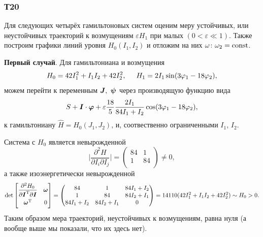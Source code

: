 \subsubsection*{Т20}


Для следующих четырёх гамильтоновых систем оценим меру устойчивых, или неустойчивых траекторий к возмущениям $\varepsilon H_1$ при малых $(0 < \varepsilon \ll 1)$. Также построим графики линий уровня $H_0 (I_1, I_2)$ и отложим на них $\omega \colon  \omega_2 = \text{const}$. 


\textbf{Первый случай}. Для гамильтониана и возмущения
\begin{equation*}
    H_0 = 42 I_1^2 + I_1 I_2 + 42 I_2^2, \hspace{5 mm} H_1 = 2 I_1 \sin(3 \varphi_1 - 18 \varphi_2),
\end{equation*}
можем перейти к переменным $\mbox{\boldmath $J$}, \ \mbox{\boldmath $\psi$}$ через производящую функцию вида
\begin{equation*}
    S + \mbox{\boldmath $I$} \cdot \mbox{\boldmath $\varphi$} + \varepsilon \frac{18}{5} \frac{2I_1}{84 I_1 + I_2} \cos(3 \varphi_1 - 18 \varphi_2),
\end{equation*}
к гамильтониану $\hat{H} = H_0(J_1, J_2)$, и, соотвественно ограниченными $I_1$, $I_2$. 

Система с $H_0$ является невырожденной 
\begin{equation*}
    \bigg| \frac{\partial^2 H}{\partial I_i \partial I_j} \bigg| = 
    \begin{pmatrix}
        84 & 1  \\
        1 & 84  \\
    \end{pmatrix} \neq 0,
\end{equation*}
а также изоэнергетически невырожденной
\begin{equation*}
     \det \begin{bmatrix}
        \vphantom{\dfrac{1}{2}}
            \dfrac{\partial^2 H_0}{\partial \vc{I}\T \partial \vc{I}} & \vc{\omega} \\
        \vphantom{\dfrac{1}{2}}
            \vc{\omega}\T & 0
        \end{bmatrix} = \begin{pmatrix}
            84 & 1 & 84 I_1 + I_2 \\
            1 & 84 & 84 I_2 + I_1 \\
            84 I_1 + I_2 & 84 I_2 + I_1 & 0 \\
        \end{pmatrix} = 14110 (42 I_1^2 + I_1 I_2 + 42 I_2^2) \sim H_0 > 0.
\end{equation*}
Таким образом мера траекторий, неустойчивых к возмущениям, равна нуля (а вообще выше мы показали, что их здесь нет).

